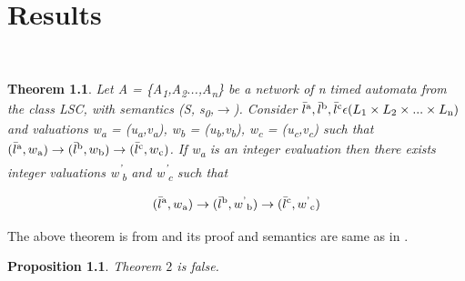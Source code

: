 \documentclass[12pt,letterpaper]{report}
\newtheorem{proposition}{Proposition}
\newtheorem{theorem}{Theorem}
\begin{document}
\chapter{Results}
\ \ \ \ \ 
\begin{theorem}
Let {\it A} = \{{\it A}\textsubscript{1},{\it A}\textsubscript{2}...,{\it A}\textsubscript{n}\} be a network of n timed automata from the class LSC, with semantics (S, s\textsubscript{0},$\rightarrow$). Consider $\bar{l} \textsuperscript{a},\bar{l} \textsuperscript{b},\bar{l} \textsuperscript{c}  \epsilon  (L\textsubscript{1} \times L\textsubscript{2} \times...\times L\textsubscript{n})$ and valuations w\textsubscript{a} = (u\textsubscript{a},v\textsubscript{a}), w\textsubscript{b} = (u\textsubscript{b},v\textsubscript{b}), w\textsubscript{c} = (u\textsubscript{c},v\textsubscript{c}) such that $(\bar{l} \textsuperscript{a},w\textsubscript{a}) \rightarrow (\bar{l} \textsuperscript{b},w\textsubscript{b}) \rightarrow (\bar{l} \textsuperscript{c},w\textsubscript{c})$. If w\textsubscript{a} is an integer evaluation then there exists integer valuations w\textsuperscript{'}\textsubscript{b} and w\textsuperscript{'}\textsubscript{c} such that

\begin{equation}
(\bar{l} \textsuperscript{a},w\textsubscript{a}) \rightarrow (\bar{l} \textsuperscript{b},w\textsuperscript{'}\textsubscript{b}) \rightarrow (\bar{l} \textsuperscript{c},w\textsuperscript{'}\textsubscript{c})
\end{equation}
\end{theorem}

The above theorem is from \cite{UPP2SF} and its proof and semantics are same as in \cite{UPP2SF}.
\begin{proposition}
 Theorem $2$ is false.
\end{proposition}
\end{document}
